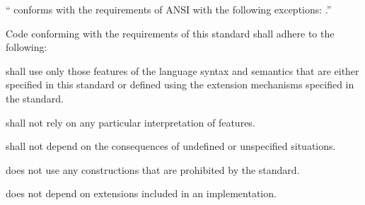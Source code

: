 \beginlist
\item{} `` conforms with the requirements of
	  ANSI  with the following exceptions: 
	  .''
\endlist 
 
\endsubsubsection%

\endsubSection%


Code conforming with the requirements of this standard shall adhere to the
following:

\beginlist
   shall use only those features of the
               language syntax and semantics that are 
	       either specified in this standard
		   or defined using the extension mechanisms 
		      specified in the standard.
 
  shall not rely on any particular
              interpretation of  features.

  shall not depend on the consequences
	      of undefined or unspecified situations.

  does not use any constructions 
	      that are prohibited by the standard.

  does not depend on extensions 
	      included in an implementation.
\endlist 

